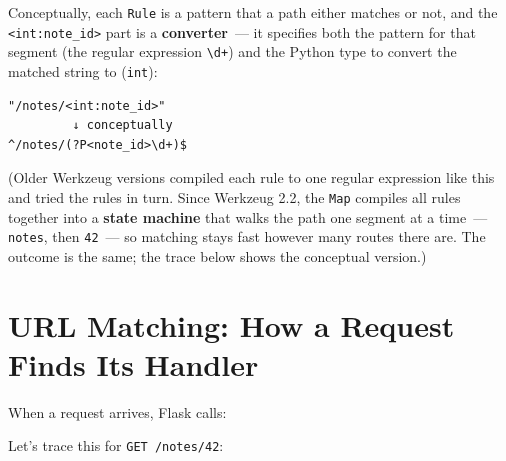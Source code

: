 \noindent{}Conceptually, each \texttt{Rule} is a pattern that a path either matches or not, and the \texttt{\textless{}int:note\_id\textgreater{}} part is a \textbf{converter}~--- it specifies both the pattern for that segment (the regular expression \texttt{\textbackslash{}d+}) and the Python type to convert the matched string to (\texttt{int}):

\begin{outputbox}[short]
\begin{Verbatim}[fontsize=\codesize, breaklines, breakanywhere, breaksymbolleft={\tiny\textcolor{muted}{$\hookrightarrow$}}]
"/notes/<int:note_id>"
         ↓ conceptually
^/notes/(?P<note_id>\d+)$
\end{Verbatim}
\end{outputbox}

\noindent{}(Older Werkzeug versions compiled each rule to one regular expression like this and tried the rules in turn. Since Werkzeug 2.2, the \texttt{Map} compiles all rules together into a \textbf{state machine} that walks the path one segment at a time~--- \texttt{notes}, then \texttt{42}~--- so matching stays fast however many routes there are. The outcome is the same; the trace below shows the conceptual version.)

\setcounter{section}{2}
\section{URL Matching: How a Request Finds Its Handler}\label{32-routing:323-url-matching-how-a-request-finds-its-handler}

When a request arrives, Flask calls:

\begin{codebox}[short]

\begin{Shaded}
\begin{Highlighting}[]
\OperatorTok{=}
\OperatorTok{=}
\end{Highlighting}
\end{Shaded}

\end{codebox}

\noindent{}Let's trace this for \texttt{GET\ /notes/42}:

